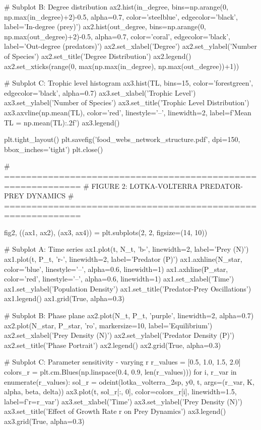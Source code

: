 \documentclass[a4paper, 11pt]{article}
\begin{document}
\begin{pycode}
# Subplot B: Degree distribution
ax2.hist(in_degree, bins=np.arange(0, np.max(in_degree)+2)-0.5,
         alpha=0.7, color='steelblue', edgecolor='black', label='In-degree (prey)')
ax2.hist(out_degree, bins=np.arange(0, np.max(out_degree)+2)-0.5,
         alpha=0.7, color='coral', edgecolor='black', label='Out-degree (predators)')
ax2.set_xlabel('Degree')
ax2.set_ylabel('Number of Species')
ax2.set_title('Degree Distribution')
ax2.legend()
ax2.set_xticks(range(0, max(np.max(in_degree), np.max(out_degree))+1))

# Subplot C: Trophic level histogram
ax3.hist(TL, bins=15, color='forestgreen', edgecolor='black', alpha=0.7)
ax3.set_xlabel('Trophic Level')
ax3.set_ylabel('Number of Species')
ax3.set_title('Trophic Level Distribution')
ax3.axvline(np.mean(TL), color='red', linestyle='--', linewidth=2, label=f'Mean TL = {np.mean(TL):.2f}')
ax3.legend()

plt.tight_layout()
plt.savefig('food_webs_network_structure.pdf', dpi=150, bbox_inches='tight')
plt.close()

# ============================================================
# FIGURE 2: LOTKA-VOLTERRA PREDATOR-PREY DYNAMICS
# ============================================================

fig2, ((ax1, ax2), (ax3, ax4)) = plt.subplots(2, 2, figsize=(14, 10))

# Subplot A: Time series
ax1.plot(t, N_t, 'b-', linewidth=2, label='Prey (N)')
ax1.plot(t, P_t, 'r-', linewidth=2, label='Predator (P)')
ax1.axhline(N_star, color='blue', linestyle='--', alpha=0.6, linewidth=1)
ax1.axhline(P_star, color='red', linestyle='--', alpha=0.6, linewidth=1)
ax1.set_xlabel('Time')
ax1.set_ylabel('Population Density')
ax1.set_title('Predator-Prey Oscillations')
ax1.legend()
ax1.grid(True, alpha=0.3)

# Subplot B: Phase plane
ax2.plot(N_t, P_t, 'purple', linewidth=2, alpha=0.7)
ax2.plot(N_star, P_star, 'ro', markersize=10, label='Equilibrium')
ax2.set_xlabel('Prey Density (N)')
ax2.set_ylabel('Predator Density (P)')
ax2.set_title('Phase Portrait')
ax2.legend()
ax2.grid(True, alpha=0.3)

# Subplot C: Parameter sensitivity - varying r
r_values = [0.5, 1.0, 1.5, 2.0]
colors_r = plt.cm.Blues(np.linspace(0.4, 0.9, len(r_values)))
for i, r_var in enumerate(r_values):
    sol_r = odeint(lotka_volterra_2sp, y0, t, args=(r_var, K, alpha, beta, delta))
    ax3.plot(t, sol_r[:, 0], color=colors_r[i], linewidth=1.5, label=f'r={r_var}')
ax3.set_xlabel('Time')
ax3.set_ylabel('Prey Density (N)')
ax3.set_title('Effect of Growth Rate r on Prey Dynamics')
ax3.legend()
ax3.grid(True, alpha=0.3)


\end{pycode}
\end{document}
